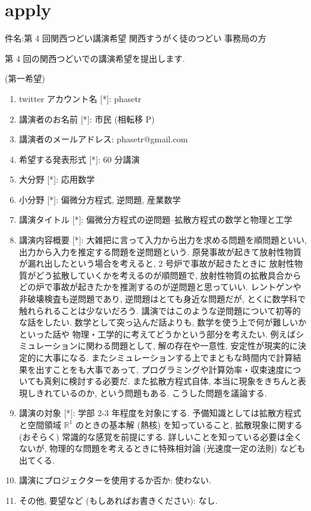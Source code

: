 \documentclass[openany, a4paper, oneside]{jsbook}
\begin{document}
\section{apply}

件名:第 4 回関西つどい講演希望
関西すうがく徒のつどい 事務局の方

第 4 回の関西つどいでの講演希望を提出します.

(第一希望)
\begin{enumerate}
\item twitter アカウント名 [*]: phasetr
\item 講演者のお名前 [*]: 市民 (相転移 P)
\item 講演者のメールアドレス: phasetr@gmail.com
\item 希望する発表形式 [*]: 60 分講演
\item 大分野 [*]: 応用数学
\item 小分野 [*]: 偏微分方程式, 逆問題, 産業数学
\item 講演タイトル [*]: 偏微分方程式の逆問題--拡散方程式の数学と物理と工学
\item 講演内容概要 [*]: 大雑把に言って入力から出力を求める問題を順問題といい,
出力から入力を推定する問題を逆問題という.
原発事故が起きて放射性物質が漏れ出したという場合を考えると, 2 号炉で事故が起きたときに
放射性物質がどう拡散していくかを考えるのが順問題で,
放射性物質の拡散具合からどの炉で事故が起きたかを推測するのが逆問題と思っていい.
レントゲンや非破壊検査も逆問題であり,
逆問題はとても身近な問題だが, とくに数学科で触れられることは少ないだろう.
講演ではこのような逆問題について初等的な話をしたい.
数学として突っ込んだ話よりも, 数学を使う上で何が難しいかといった話や
物理・工学的に考えてどうかという部分を考えたい.
例えばシミュレーションに関わる問題として, 解の存在や一意性, 安定性が現実的に決定的に大事になる.
またシミュレーションする上でまともな時間内で計算結果を出すことをも大事であって,
プログラミングや計算効率・収束速度についても真剣に検討する必要だ.
また拡散方程式自体, 本当に現象をきちんと表現しきれているのか, という問題もある.
こうした問題を議論する.
\item 講演の対象 [*]: 学部 2-3 年程度を対象にする.
予備知識としては拡散方程式と空間領域 $\mathbb{R}^1$ のときの基本解 (熱核) を知っていること,
拡散現象に関する (おそらく) 常識的な感覚を前提にする.
詳しいことを知っている必要は全くないが,
物理的な問題を考えるときに特殊相対論 (光速度一定の法則) なども出てくる.
\item 講演にプロジェクターを使用するか否か: 使わない.
\item その他, 要望など (もしあればお書きください): なし.
\end{enumerate}
\end{document}
